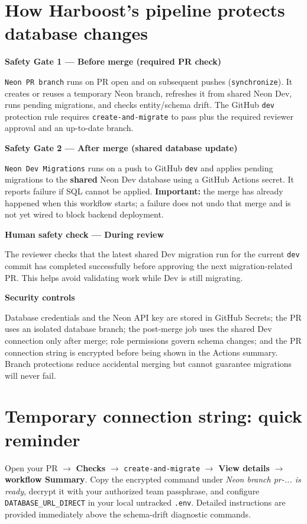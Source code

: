 \documentclass[10pt,a4paper]{article}
\begin{document}
\section*{How Harboost's pipeline protects database changes}
\begin{tcolorbox}[colback=pale,colframe=lightborder,boxrule=.7pt,arc=2mm]
\textbf{Safety Gate 1 --- Before merge (required PR check)}\par
\texttt{Neon PR branch} runs on PR open and on subsequent pushes (\texttt{synchronize}). It creates or reuses a temporary Neon branch, refreshes it from shared Neon Dev, runs pending migrations, and checks entity/schema drift. The GitHub \texttt{dev} protection rule requires \texttt{create-and-migrate} to pass plus the required reviewer approval and an up-to-date branch.\par
\medskip
\textbf{Safety Gate 2 --- After merge (shared database update)}\par
\texttt{Neon Dev Migrations} runs on a push to GitHub \texttt{dev} and applies pending migrations to the \textbf{shared} Neon Dev database using a GitHub Actions secret. It reports failure if SQL cannot be applied. \textbf{Important:} the merge has already happened when this workflow starts; a failure does not undo that merge and is not yet wired to block backend deployment.\par
\medskip
\textbf{Human safety check --- During review}\par
The reviewer checks that the latest shared Dev migration run for the current \texttt{dev} commit has completed successfully before approving the next migration-related PR. This helps avoid validating work while Dev is still migrating.\par
\medskip
\textbf{Security controls}\par
Database credentials and the Neon API key are stored in GitHub Secrets; the PR uses an isolated database branch; the post-merge job uses the shared Dev connection only after merge; role permissions govern schema changes; and the PR connection string is encrypted before being shown in the Actions summary. Branch protections reduce accidental merging but cannot guarantee migrations will never fail.
\end{tcolorbox}

\section*{Temporary connection string: quick reminder}
Open your PR $\rightarrow$ \textbf{Checks} $\rightarrow$ \texttt{create-and-migrate} $\rightarrow$ \textbf{View details} $\rightarrow$ \textbf{workflow Summary}. Copy the encrypted command under \emph{Neon branch pr-... is ready}, decrypt it with your authorized team passphrase, and configure \texttt{DATABASE\_URL\_DIRECT} in your local untracked \texttt{.env}. Detailed instructions are provided immediately above the schema-drift diagnostic commands.
\end{document}
